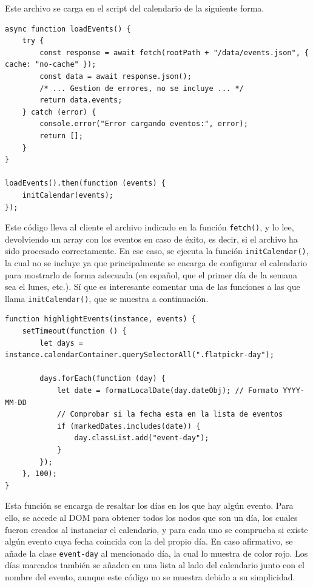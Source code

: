 \documentclass[11pt, a4paper]{book}
\begin{document}
	Este archivo se carga en el script del calendario de la siguiente forma.
	
	\begin{lstlisting}
async function loadEvents() {
	try {
		const response = await fetch(rootPath + "/data/events.json", { cache: "no-cache" });
		const data = await response.json();
		/* ... Gestion de errores, no se incluye ... */
		return data.events;
	} catch (error) {
		console.error("Error cargando eventos:", error);
		return [];
	}
}

loadEvents().then(function (events) {
	initCalendar(events);
});
	\end{lstlisting}
	
	Este código lleva al cliente el archivo indicado en la función \texttt{fetch()}, y lo lee, devolviendo un array con los eventos en caso de éxito, es decir, si el archivo ha sido procesado correctamente. En ese caso, se ejecuta la función \texttt{initCalendar()}, la cual no se incluye ya que principalmente se encarga de configurar el calendario para mostrarlo de forma adecuada (en español, que el primer día de la semana sea el lunes, etc.). Sí que es interesante comentar una de las funciones a las que llama \texttt{initCalendar()}, que se muestra a continuación.
	
	\begin{lstlisting}
function highlightEvents(instance, events) {
	setTimeout(function () {
		let days = instance.calendarContainer.querySelectorAll(".flatpickr-day");
		
		days.forEach(function (day) {
			let date = formatLocalDate(day.dateObj); // Formato YYYY-MM-DD
			// Comprobar si la fecha esta en la lista de eventos
			if (markedDates.includes(date)) {
				day.classList.add("event-day");
			}
		});
	}, 100);
}
	\end{lstlisting}
	
	Esta función se encarga de resaltar los días en los que hay algún evento. Para ello, se accede al DOM para obtener todos los nodos que son un día, los cuales fueron creados al instanciar el calendario, y para cada uno se comprueba si existe algún evento cuya fecha coincida con la del propio día. En caso afirmativo, se añade la clase \texttt{event-day} al mencionado día, la cual lo muestra de color rojo. Los días marcados también se añaden en una lista al lado del calendario junto con el nombre del evento, aunque este código no se muestra debido a su simplicidad.
	
\end{document}
